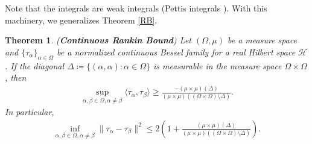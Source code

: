 \documentclass{amsart}
\newtheorem{theorem}{Theorem}[section]
\begin{document}
Note that the integrals are weak integrals (Pettis integrals \cite{TALAGRAND}). With  this machinery, we generalizes Theorem \ref{RB}.
\begin{theorem} (\textbf{Continuous Rankin Bound})  \label{CRB}
 Let $(\Omega, \mu)$ be a  measure space and $\{\tau_\alpha\}_{\alpha\in \Omega}$ be a 	normalized continuous Bessel  family for  a real Hilbert space $\mathcal{H}$. If the diagonal $\Delta\coloneqq \{(\alpha, \alpha):\alpha \in \Omega\}$ is measurable in the measure space $\Omega\times \Omega$, then
 \begin{align}\label{CD0}
 	\sup _{\alpha, \beta \in \Omega, \alpha\neq \beta}\langle \tau_\alpha, \tau_\beta\rangle \geq \frac{-(\mu\times\mu)(\Delta)}{(\mu\times\mu)((\Omega\times\Omega)\setminus\Delta)}.	
 \end{align}
 In particular, 
 \begin{align}\label{CD}
 	\inf _{\alpha, \beta \in \Omega, \alpha\neq \beta}\|\tau_\alpha-\tau_\beta\|^2\leq 2 \left(1+\frac{(\mu\times\mu)(\Delta)}{(\mu\times\mu)((\Omega\times\Omega)\setminus\Delta)}	\right).
 \end{align}
\end{theorem}
\end{document}

